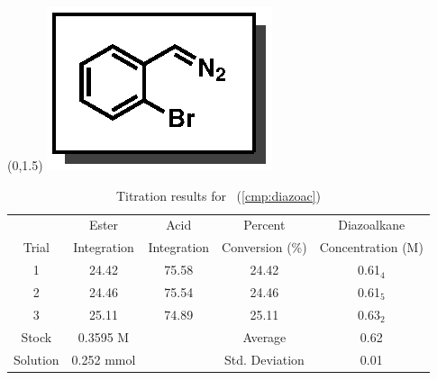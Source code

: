 \begin{singlespace}
\begin{table}[htbp]
\begin{textblock}{1}(0,1.5)
\includegraphics[scale=0.8]{chp_asymmetric/images/diazoac}
\end{textblock}
\flushright
{\small
\begin{tabular}{ccccc} 
\toprule
&Ester&Acid&Percent&Diazoalkane\\
Trial&Integration&Integration&Conversion (\%)&Concentration (M) \\ 
\midrule
1 & 24.42 & 75.58 & 24.42 & 0.61$_4$ \\
2 & 24.46 & 75.54 & 24.46 & 0.61$_5$ \\
3 & 25.11 & 74.89 & 25.11 & 0.63$_2$ \\
\midrule
Stock & 0.3595 M & & Average & 0.62 \\
Solution & 0.252 mmol & & Std. Deviation & 0.01 \\
\bottomrule
\end{tabular}
\caption{Titration results for \CMPdiazoac~(\ref{cmp:diazoac})}
}
\end{table}
\end{singlespace}

